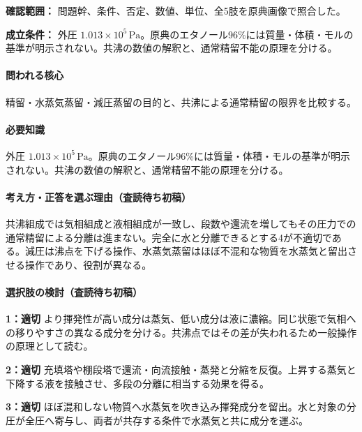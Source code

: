 \noindent\textbf{確認範囲：} 問題幹、条件、否定、数値、単位、全5肢を原典画像で照合した。\par

\noindent\textbf{成立条件：} 外圧 \(1.013\times10^5\,\mathrm{Pa}\)。原典のエタノール96\%には質量・体積・モルの基準が明示されない。共沸の数値の解釈と、通常精留不能の原理を分ける。\par

\paragraph{問われる核心} 精留・水蒸気蒸留・減圧蒸留の目的と、共沸による通常精留の限界を比較する。

\paragraph{必要知識} 外圧 \(1.013\times10^5\,\mathrm{Pa}\)。原典のエタノール96\%には質量・体積・モルの基準が明示されない。共沸の数値の解釈と、通常精留不能の原理を分ける。

\paragraph{考え方・正答を選ぶ理由（査読待ち初稿）} 共沸組成では気相組成と液相組成が一致し、段数や還流を増してもその圧力での通常精留による分離は進まない。完全に水と分離できるとする4が不適切である。減圧は沸点を下げる操作、水蒸気蒸留はほぼ不混和な物質を水蒸気と留出させる操作であり、役割が異なる。

\paragraph{選択肢の検討（査読待ち初稿）}\mbox{}\par

\noindent\textbf{1：適切} より揮発性が高い成分は蒸気、低い成分は液に濃縮。同じ状態で気相への移りやすさの異なる成分を分ける。共沸点ではその差が失われるため一般操作の原理として読む。\par

\noindent\textbf{2：適切} 充填塔や棚段塔で還流・向流接触・蒸発と分縮を反復。上昇する蒸気と下降する液を接触させ、多段の分離に相当する効果を得る。\par

\noindent\textbf{3：適切} ほぼ混和しない物質へ水蒸気を吹き込み揮発成分を留出。水と対象の分圧が全圧へ寄与し、両者が共存する条件で水蒸気と共に成分を運ぶ。\par

